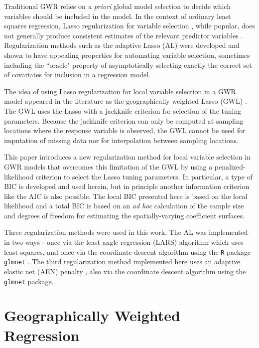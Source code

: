 \documentclass[authoryear, review, 11pt]{elsarticle}
\begin{document}
	Traditional GWR relies on \emph{a priori} global model selection to decide which variables should be included in the model. In the context of ordinary least squares regression, Lasso regularization for variable selection \citep{Tibshirani:1996}, while popular, does not generally produce consistent estimates of the relevant predictor variables \citep{Leng-2006}. Regularization methods such as the adaptive Lasso (AL) \citep{Zou:2006} were developed and shown to have appealing properties for automating variable selection, sometimes including the ``oracle" property of asymptotically selecting exactly the correct set of covariates for inclusion in a regression model.
	
	The idea of using Lasso regularization for local variable selection in a GWR model appeared in the literature as the geographically weighted Lasso (GWL) \citep{Wheeler:2009}. The GWL uses the Lasso with a jackknife criterion for selection of the tuning parameters. Because the jackknife criterion can only be computed at sampling locations where the response variable is observed, the GWL cannot be used for imputation of missing data nor for interpolation between sampling locations.
	
	This paper introduces a new regularization method for local variable selection in GWR models that overcomes this limitation of the GWL by using a penalized-likelihood criterion to select the Lasso tuning parameters. In particular, a type of BIC is developed and used herein, but in principle another information criterion like the AIC is also possible. The local BIC presented here is based on the local likelihood \citep{Loader:1999} and a total BIC is based on an \emph{ad hoc} calculation of the sample size and degrees of freedom for estimating the spatially-varying coefficient surfaces.
	
	Three regularization methods were used in this work. The AL was implemented in two ways - once via the least angle regression (LARS) algorithm \citep{Efron:2004b} which uses least squares, and once via the coordinate descent algorithm using the {\tt R} package {\tt glmnet} \citep{Friedman:2010}. The third regularization method implemented here uses an adaptive elastic net (AEN) penalty \citep{Zou:2009}, also via the coordinate descent algorithm using the {\tt glmnet} package.
	

\section{Geographically Weighted Regression \label{section:GWR}}
\end{document}
